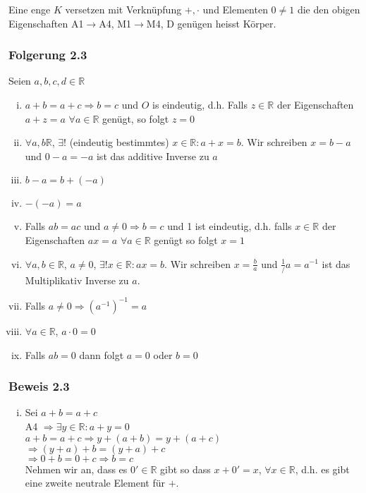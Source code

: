 \begin{enumerate}
Eine enge $K$ versetzen mit Verknüpfung $+,\cdot$ und Elementen $0\not =1$ die den obigen Eigenschaften 
A1$\rightarrow$A4, M1$\rightarrow$M4, D genügen heisst Körper. 

\subsubsection*{Folgerung 2.3}
Seien $a,b,c,d\in\mathbb{R}$ 
\begin{enumerate}[i)]
\item $a+b=a+c\Rightarrow b=c$ und $O$ is eindeutig, d.h. Falls $z\in\mathbb{R}$ der Eigenschaften $a+z=a$ $\forall a\in\mathbb{R}$ genügt, so folgt $z=0$
\item $\forall a,b\mathbb{R}$, $\exists !$ (eindeutig bestimmtes) $x\in\mathbb{R}:a+x=b$. Wir schreiben $x=b-a$ und $0-a=-a$ ist das additive Inverse zu $a$
\item $b-a=b+(-a)$
\item $-(-a)=a$
\item Falls $ab=ac$ und $a\not = 0\Rightarrow b=c$ und 1 ist eindeutig, d.h. falls $x\in\mathbb{R}$ der Eigenschaften $ax=a$ $\forall a\in\mathbb{R}$ genügt so folgt $x=1$
\item $\forall a,b\in\mathbb{R}$, $a\not =0$, $\exists !x\in\mathbb{R}:ax=b$. Wir schreiben $x=\frac{b}{a}$ und $\frac{1}/{a}=a^{-1}$ ist das Multiplikativ Inverse zu $a$.
\item Falls $a\not =0\Rightarrow {\left(a^{-1}\right)}^{-1}=a$ 
\item $\forall a\in\mathbb{R}$, $a\cdot 0=0$
\item Falls $ab=0$ dann folgt $a=0$ oder $b=0$
\end{enumerate}
\subsubsection*{Beweis 2.3}
\begin{enumerate}[i)]
\item Sei $a+b=a+c$\\ A4 $\Rightarrow\exists y\in\mathbb{R}:a+y=0$\\$a+b=a+c\Rightarrow y+(a+b)=y+(a+c)$\\$\Rightarrow (y+a)+b=(y+a)+c$\\$\Rightarrow 0+b=0+c \Rightarrow b=c$ \\
Nehmen wir an, dass es $0'\in\mathbb{R}$ gibt so dass $x+0'=x$, $\forall x\in\mathbb{R}$, d.h. es gibt eine zweite neutrale Element für $+$.\\


\end{enumerate}
\end{enumerate}
